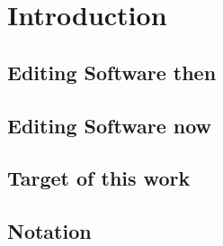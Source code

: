 
\chapter{Introduction}

\section{Editing Software then}

\section{Editing Software now}

\section{Target of this work}


\section{Notation}

